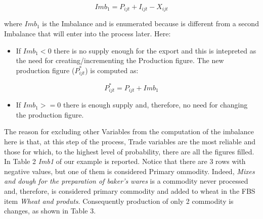 \documentclass[]{article}
\providecommand{\tightlist}{%
  \setlength{\itemsep}{0pt}\setlength{\parskip}{0pt}}
\begin{document}
\begin{equation}
\label{eq:imbalance1}
Imb_{1} = P_{ijt} + I_{ijt} - X_{ijt}
\end{equation}

where \(Imb_{1}\) is the Imbalance and is enumerated because is
different from a second Imbalance that will enter into the process
later. Here:

\begin{itemize}
\tightlist
\item
  If \(Imb_{1} < 0\) there is no supply enough for the export and this
  is intepreted as the need for creating/incrementing the Production
  figure. The new production figure (\(P^*_{ijt}\)) is computed as:
\end{itemize}

\begin{equation}
\label{eq:imbalance1}
 P^*_{ijt} = P_{ijt} + Imb_{1}
\end{equation}

\begin{itemize}
\tightlist
\item
  If \(Imb_{1} >= 0\) there is enough supply and, therefore, no need for
  changing the production figure.
\end{itemize}

The reason for excluding other Variables from the computation of the
imbalance here is that, at this step of the process, Trade variables are
the most reliable and those for which, to the highest level of
probability, there are all the figures filled. In Table 2 \emph{Imb1} of
our example is reported. Notice that there are 3 rows with negative
values, but one of them is considered Primary ommodity. Indeed,
\emph{Mixes and dough for the preparation of baker's wares} is a
commodity never processed and, therefore, is considered primary
commodity and added to wheat in the FBS item \emph{Wheat and produts}.
Consequently production of only 2 commodity is changes, as shown in
Table 3.
\end{document}
